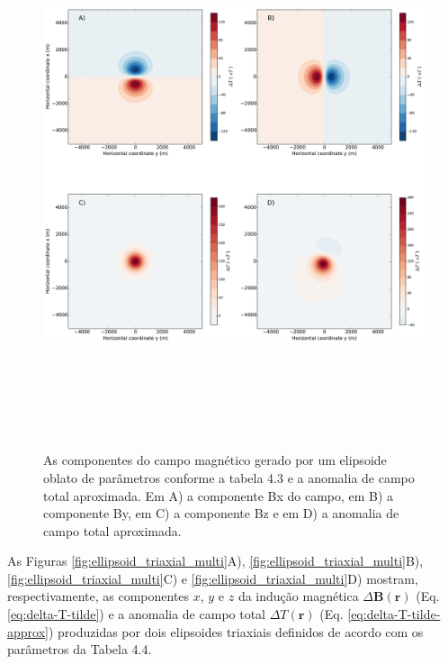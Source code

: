 \begin{figure}[hbt!]
	\centering \includegraphics[width=16cm,height=16cm]{figures/ellipsoid_oblate}
	\caption[As componentes do campo magnético gerado por um elipsoide oblato e a anomalia de campo total aproximada.]{As componentes 
		do campo magnético gerado por um elipsoide oblato de parâmetros conforme a tabela 4.3 e a anomalia de campo total aproximada. Em A) a componente Bx do campo, em B) a componente By, em C) a componente Bz e em D) a anomalia de campo total aproximada.}
	\label{fig:oblate}
\end{figure}

As Figuras \ref{fig:ellipsoid_triaxial_multi}A), \ref{fig:ellipsoid_triaxial_multi}B), \ref{fig:ellipsoid_triaxial_multi}C) e \ref{fig:ellipsoid_triaxial_multi}D) mostram, respectivamente, as componentes $x$, $y$ e $z$ da indução magnética $\Delta \mathbf{B}(\mathbf{r})$ (Eq. \ref{eq:delta-T-tilde}) e a
anomalia de campo total $\Delta T (\mathbf{r})$ (Eq. \ref{eq:delta-T-tilde-approx}) produzidas por dois elipsoides triaxiais definidos de acordo com os parâmetros da Tabela 4.4.

